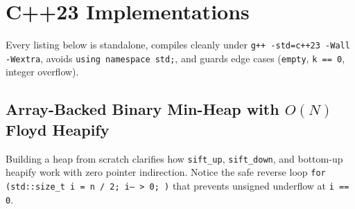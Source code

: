 \documentclass[11pt,a4paper]{article}
\theoremstyle{definition}
\begin{document}
\section{C++23 Implementations}

Every listing below is standalone, compiles cleanly under \texttt{g++ -std=c++23 -Wall -Wextra}, avoids \texttt{using namespace std;}, and guards edge cases (\texttt{empty}, \texttt{k == 0}, integer overflow).

\subsection{Array-Backed Binary Min-Heap with \texorpdfstring{$O(N)$}{O(N)} Floyd Heapify}

Building a heap from scratch clarifies how \texttt{sift\_up}, \texttt{sift\_down}, and bottom-up heapify work with zero pointer indirection. Notice the safe reverse loop \texttt{for (std::size\_t i = n / 2; i-- > 0; )} that prevents unsigned underflow at \texttt{i == 0}.
\end{document}
